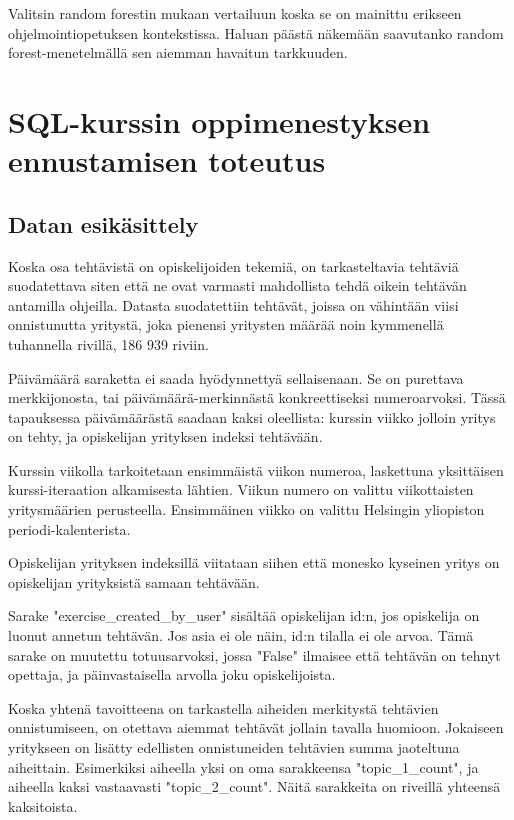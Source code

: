 \documentclass[finnish,twoside,openright]{HYgraduMLDS}
\begin{document}
Valitsin random forestin mukaan vertailuun koska se on mainittu erikseen ohjelmointiopetuksen kontekstissa. Haluan päästä näkemään saavutanko random forest-menetelmällä sen aiemman havaitun tarkkuuden.


\chapter{SQL-kurssin oppimenestyksen ennustamisen toteutus}

\section{Datan esikäsittely}

Koska osa tehtävistä on opiskelijoiden tekemiä, on tarkasteltavia tehtäviä suodatettava siten että ne ovat varmasti mahdollista tehdä oikein tehtävän antamilla ohjeilla. Datasta suodatettiin tehtävät, joissa on vähintään viisi onnistunutta yritystä, joka pienensi yritysten määrää noin kymmenellä tuhannella rivillä, 186 939 riviin.

Päivämäärä saraketta ei saada hyödynnettyä sellaisenaan. Se on purettava merkkijonosta, tai päivämäärä-merkinnästä konkreettiseksi numeroarvoksi. Tässä tapauksessa päivämäärästä saadaan kaksi oleellista: kurssin viikko jolloin yritys on tehty, ja opiskelijan yrityksen indeksi tehtävään.

Kurssin viikolla tarkoitetaan ensimmäistä viikon numeroa, laskettuna yksittäisen kurssi-iteraation alkamisesta lähtien. Viikun numero on valittu viikottaisten yritysmäärien perusteella. Ensimmäinen viikko on valittu Helsingin yliopiston periodi-kalenterista\cite{kalenteri18-19, kalenteri19-20}.

Opiskelijan yrityksen indeksillä viitataan siihen että monesko kyseinen yritys on opiskelijan yrityksistä samaan tehtävään.

Sarake "exercise\_created\_by\_user" sisältää opiskelijan id:n, jos opiskelija on luonut annetun tehtävän. Jos asia ei ole näin, id:n tilalla ei ole arvoa. Tämä sarake on muutettu totuusarvoksi, jossa "False" ilmaisee että tehtävän on tehnyt opettaja, ja päinvastaisella arvolla joku opiskelijoista.

Koska yhtenä tavoitteena on tarkastella aiheiden merkitystä tehtävien onnistumiseen, on otettava aiemmat tehtävät jollain tavalla huomioon. Jokaiseen yritykseen on lisätty edellisten onnistuneiden tehtävien summa jaoteltuna aiheittain. Esimerkiksi aiheella yksi on oma sarakkeensa "topic\_1\_count", ja aiheella kaksi vastaavasti "topic\_2\_count". Näitä sarakkeita on riveillä yhteensä 
kaksitoista.
\end{document}
